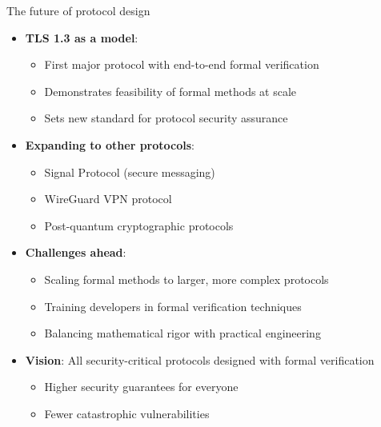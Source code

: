 \documentclass[aspectratio=169, lualatex, handout]{beamer}
\begin{document}
\begin{frame}{The future of protocol design}
	\begin{itemize}[<+->]
		\item \textbf{TLS 1.3 as a model}:
		      \begin{itemize}
			      \item First major protocol with end-to-end formal verification
			      \item Demonstrates feasibility of formal methods at scale
			      \item Sets new standard for protocol security assurance
		      \end{itemize}
		\item \textbf{Expanding to other protocols}:
		      \begin{itemize}
			      \item Signal Protocol (secure messaging)
			      \item WireGuard VPN protocol
			      \item Post-quantum cryptographic protocols
		      \end{itemize}
		\item \textbf{Challenges ahead}:
		      \begin{itemize}
			      \item Scaling formal methods to larger, more complex protocols
			      \item Training developers in formal verification techniques
			      \item Balancing mathematical rigor with practical engineering
		      \end{itemize}
		\item \textbf{Vision}: All security-critical protocols designed with formal verification
		      \begin{itemize}
			      \item Higher security guarantees for everyone
			      \item Fewer catastrophic vulnerabilities
		      \end{itemize}
	\end{itemize}
\end{frame}

\begin{frame}[plain]
	\titlepage
\end{frame}
\end{document}
